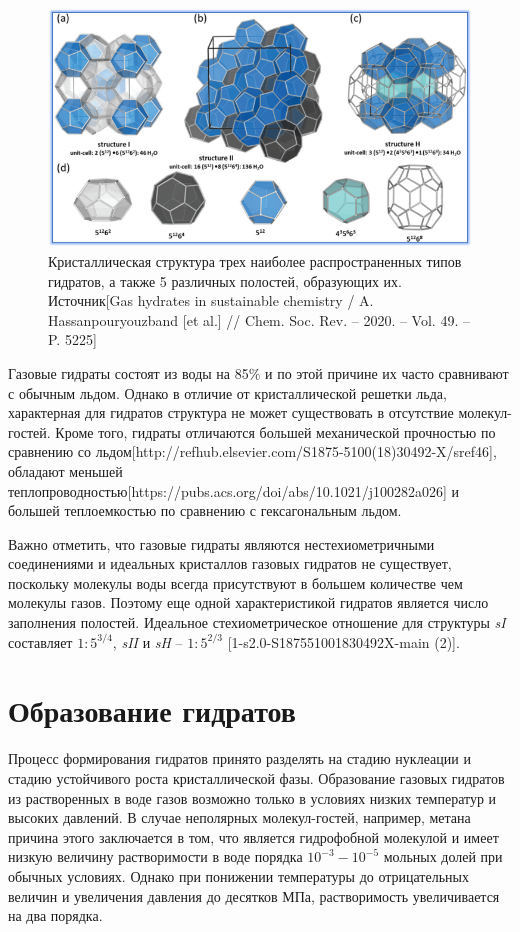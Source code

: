 \begin{figure}[H]
    \centering
    \includegraphics[width=.9\linewidth]{figures/hydrstruct.png}
    \caption{Кристаллическая структура трех наиболее распространенных типов гидратов, а также 5 различных полостей, образующих их. Источник[Gas hydrates in sustainable chemistry / A. Hassanpouryouzband [et al.] // Chem. Soc. Rev. – 2020. – Vol. 49. – P. 5225]}
    \label{fig1.2.1}
\end{figure}

\par Газовые гидраты состоят из воды на 85\% и по этой причине их часто сравнивают с обычным льдом. Однако в отличие от кристаллической решетки льда, характерная для гидратов структура не может существовать в отсутствие молекул-гостей. Кроме того, гидраты отличаются большей механической прочностью по сравнению со льдом[http://refhub.elsevier.com/S1875-5100(18)30492-X/sref46], обладают меньшей теплопроводностью[https://pubs.acs.org/doi/abs/10.1021/j100282a026] и большей теплоемкостью по сравнению с гексагональным льдом.

\par Важно отметить, что газовые гидраты являются нестехиометричными соединениями и идеальных кристаллов газовых гидратов не существует, поскольку молекулы воды всегда присутствуют в большем  количестве чем молекулы газов. Поэтому еще одной характеристикой гидратов является число заполнения полостей. Идеальное стехиометрическое отношение для структуры \textit{sI} составляет $1:5^{3/4}$, \textit{sII} и \textit{sH} -- $1:5^{2/3}$ [1-s2.0-S187551001830492X-main (2)].

\pagebreak
\section{Образование гидратов}
\par Процесс формирования гидратов принято разделять на стадию нуклеации и стадию устойчивого роста кристаллической фазы. Образование газовых гидратов из растворенных в воде газов возможно только в условиях низких температур и высоких давлений. В случае неполярных молекул-гостей, например, метана причина этого заключается в том, что  является гидрофобной молекулой и имеет низкую величину растворимости в воде порядка $10^{-3}-10^{-5}$ мольных долей при обычных условиях. Однако при понижении температуры до отрицательных величин и увеличения давления до десятков МПа, растворимость   увеличивается на два порядка.


